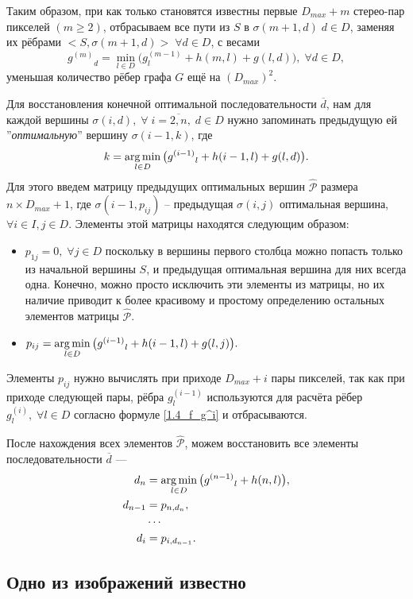 Таким образом, при как только становятся известны первые $D_{max}+m$ стерео-пар пикселей $( m \geqslant 2)$, отбрасываем все пути из $S$ в 
$\sigma(m+1, d) \; d \in D$, заменяя их рёбрами $<S, \sigma(m+1, d) > \; \forall d \in D$, с весами 
\begin{equation}\label{1.4_f_g^i}
{g^{(m)}}_d = \min\limits_{l \in D}{\big( g^{(m-1)}_l + h(m, l) + g(l, d) \big) },  \; \forall d \in D,
\end{equation}
уменьшая количество рёбер графа $G$ ещё на $(D_{max})^2$.
\newpage

Для восстановления конечной оптимальной последовательности $\overline{d}$, нам для каждой вершины $\sigma(i, d), \; \forall \;	i = \overline{2, n}, \; d \in D$ нужно запоминать предыдущую ей ''\textit{оптимальную}'' вершину $\sigma(i-1, k)$, где 
$$k = \operatorname*{arg\,min}\limits_{l \in D}{\big( {g^{(i-1)}}_l + h(i-1, l) + g(l, d) \big) }.$$
Для этого введем матрицу предыдущих оптимальных вершин $\hat{\mathcal{P}}$ размера \\
$n \times D_{max} + 1$, где $\sigma(i-1, p_{ij}) $ -- предыдущая $\sigma(i, j)$ оптимальная вершина, \\
$\forall i \in I, j \in D$. Элементы этой матрицы находятся следующим образом:
\begin{itemize}
\item $p_{1j} = 0, \; \forall j \in D$ поскольку в вершины первого столбца можно попасть только из начальной вершины $S$, и предыдущая оптимальная вершина для них всегда одна. Конечно, можно просто исключить эти элементы из матрицы, но их наличие приводит к более красивому и простому определению остальных элементов матрицы 
$\hat{\mathcal{P}}$.
\item $p_{ij} = \operatorname*{arg\,min}\limits_{l \in D}{\big( {g^{(i-1)}}_l + h(i-1, l) + g(l, j) \big) }.$
\end{itemize}
Элементы $p_{ij}$ нужно вычислять при приходе $D_{max} + i$ пары пикселей, так как при приходе следующей пары, рёбра $ g^{(i-1)}_l $ используются  
для расчёта рёбер $ g^{(i)}_l, \; \forall l \in D $ согласно формуле \ref{1.4_f_g^i} и отбрасываются.

После нахождения всех элементов $\hat{\mathcal{P}}$, можем восстановить все элементы последовательности $\overline{d}$ ---
\begin{align*}
d_n &= \operatorname*{arg\,min}\limits_{l \in D}  {\big( {g^{(n-1)}}_l + h(n, l) \big) }, \\
d_{n-1} &= p_{n,d_n},\\
&\cdots\\
d_i &= p_{i,d_{n-1}}.
\end{align*}



\subsection{Одно из изображений известно}


























